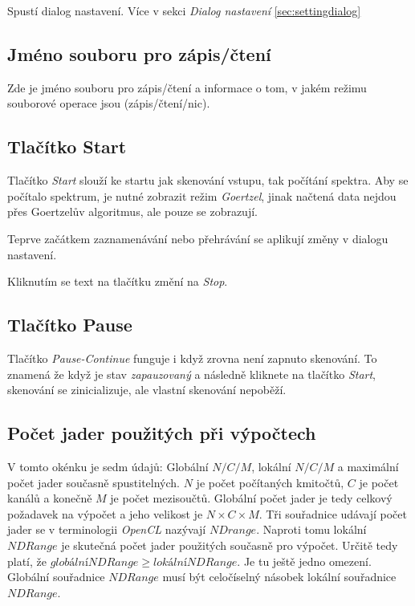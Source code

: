 Spustí dialog nastavení. Více v sekci \emph{Dialog nastavení} \ref{sec:settingdialog}

\subsection{Jméno souboru pro zápis/čtení}

Zde je jméno souboru pro zápis/čtení a informace o tom, v jakém režimu souborové operace jsou (zápis/čtení/nic).

\subsection{Tlačítko Start}

Tlačítko \emph{Start} slouží ke startu jak skenování vstupu, tak počítání spektra.
Aby se počítalo spektrum, je nutné zobrazit režim \emph{Goertzel}, jinak načtená data nejdou přes Goertzelův algoritmus, ale pouze se zobrazují.

Teprve začátkem zaznamenávání nebo přehrávání se aplikují změny v dialogu nastavení.

Kliknutím se text na tlačítku změní na \emph{Stop}.

\subsection{Tlačítko Pause}

Tlačítko \emph{Pause-Continue} funguje i když zrovna není zapnuto skenování. To znamená že když je stav \emph{zapauzovaný} a následně kliknete na tlačítko \emph{Start}, skenování se zinicializuje, ale vlastní skenování nepoběží.

\subsection{Počet jader použitých při výpočtech}
\label{sec:nkernels}

V tomto okénku je sedm údajů: Globální $N/C/M$, lokální $N/C/M$ a maximální počet jader současně spustitelných.  $N$ je počet počítaných kmitočtů, $C$ je počet kanálů a konečně $M$ je počet mezisoučtů. Globální počet jader je tedy celkový požadavek na výpočet a jeho velikost je $N\times C\times M$. Tři souřadnice udávají počet jader se v terminologii  \emph{OpenCL} nazývají $NDrange$. Naproti tomu lokální $NDRange$ je skutečná počet jader použitých současně pro výpočet. Určitě tedy platí, že $globální NDRange \geq lokální NDRange$. Je tu ještě jedno omezení. Globální souřadnice $NDRange$ 
musí být celočíselný násobek lokální souřadnice $NDRange$.

